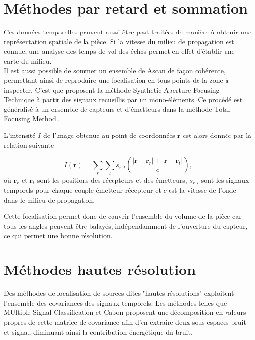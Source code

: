\section{Méthodes par retard et sommation}
Ces données temporelles peuvent aussi être post-traitées de manière à obtenir une représentation spatiale de la pièce. Si la vitesse du milieu de propagation est connue, une analyse des temps de vol des échos permet en effet d'établir une carte du milieu. \\

Il est aussi possible de sommer un ensemble de Ascan de façon cohérente, permettant ainsi de reproduire une focalisation en tous points de la zone à inspecter. C'est que proposent la méthode Synthetic Aperture Focusing Technique \citep{doctor_saft} à partir des signaux recueillis par un mono-éléments. Ce procédé est généralisé à un ensemble de capteurs et d'émetteurs dans la méthode Total Focusing Method \citep{holmes_tfm}. 

L'intensité $I$ de l'image obtenue au point de coordonnées $\bm{r}$ est alors donnée par la relation suivante : 

\begin{equation*}
	I(\bm{r})= \displaystyle\sum_{r} \displaystyle\sum_{t} s_{r,t}\left( \frac{|\bm{r} - \bm{r}_r| + |\bm{r} - \bm{r}_t|}{c}\right) \text{,}
\end{equation*}
où $\bm{r}_r$ et $\bm{r}_t$ sont les positions des récepteurs et des émetteurs, $s_{r,t}$ sont les signaux temporels pour chaque couple émetteur-récepteur et $c$ est la vitesse de l'onde dans le milieu de propagation.

Cette focalisation permet donc de couvrir l'ensemble du volume de la pièce car tous les angles peuvent être balayés, indépendamment de l'ouverture du capteur, ce qui permet une bonne résolution.\\






\section{Méthodes hautes résolution}


Des méthodes de localisation de sources dites "hautes résolutions" exploitent l'ensemble des covariances des signaux temporels. Les méthodes telles que MUltiple Signal Classification \citep{schmidt} et Capon \citep{capon} proposent une décomposition en valeurs propres de cette matrice de covariance afin d'en extraire deux sous-espaces bruit et signal, diminuant ainsi la contribution énergétique du bruit. \\

